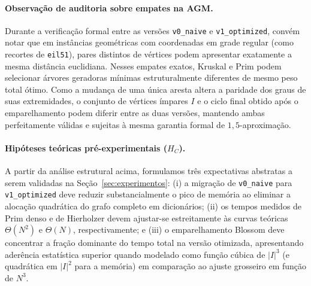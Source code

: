 \paragraph{Observação de auditoria sobre empates na AGM.}
Durante a verificação formal entre as versões \texttt{v0\_naive} e \texttt{v1\_optimized},
convém notar que em instâncias geométricas com coordenadas em grade regular (como recortes de
\texttt{eil51}), pares distintos de vértices podem apresentar exatamente a mesma distância
euclidiana. Nesses empates exatos, Kruskal e Prim podem selecionar árvores geradoras mínimas
estruturalmente diferentes de mesmo peso total ótimo. Como a mudança de uma única aresta altera
a paridade dos graus de suas extremidades, o conjunto de vértices ímpares $I$ e o ciclo final
obtido após o emparelhamento podem diferir entre as duas versões, mantendo ambas perfeitamente
válidas e sujeitas à mesma garantia formal de $1{,}5$-aproximação.

\paragraph{Hipóteses teóricas pré-experimentais ($H_C$).}
A partir da análise estrutural acima, formulamos três expectativas abstratas a serem validadas
na Seção~\ref{sec:experimentos}: (i) a migração de \texttt{v0\_naive} para
\texttt{v1\_optimized} deve reduzir substancialmente o pico de memória ao eliminar a alocação
quadrática do grafo completo em dicionários; (ii) os tempos medidos de Prim denso e de
Hierholzer devem ajustar-se estreitamente às curvas teóricas $\Theta(N^2)$ e $\Theta(N)$,
respectivamente; e (iii) o emparelhamento Blossom deve concentrar a fração dominante do tempo
total na versão otimizada, apresentando aderência estatística superior quando modelado como
função cúbica de $|I|^3$ (e quadrática em $|I|^2$ para a memória) em comparação ao ajuste
grosseiro em função de $N^3$.
